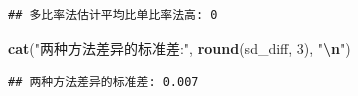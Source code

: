\documentclass[
]{article}
\newenvironment{Shaded}{\begin{snugshade}}{\end{snugshade}}
\newcommand{\DecValTok}[1]{\textcolor[rgb]{0.00,0.00,0.81}{#1}}
\newcommand{\FunctionTok}[1]{\textcolor[rgb]{0.13,0.29,0.53}{\textbf{#1}}}
\newcommand{\NormalTok}[1]{#1}
\newcommand{\SpecialCharTok}[1]{\textcolor[rgb]{0.81,0.36,0.00}{\textbf{#1}}}
\newcommand{\StringTok}[1]{\textcolor[rgb]{0.31,0.60,0.02}{#1}}
\begin{document}
\begin{verbatim}
## 多比率法估计平均比单比率法高: 0
\end{verbatim}

\begin{Shaded}
\begin{Highlighting}[]
\FunctionTok{cat}\NormalTok{(}\StringTok{"两种方法差异的标准差:"}\NormalTok{, }\FunctionTok{round}\NormalTok{(sd\_diff, }\DecValTok{3}\NormalTok{), }\StringTok{"}\SpecialCharTok{\textbackslash{}n}\StringTok{"}\NormalTok{)}
\end{Highlighting}
\end{Shaded}

\begin{verbatim}
## 两种方法差异的标准差: 0.007
\end{verbatim}
\end{document}
